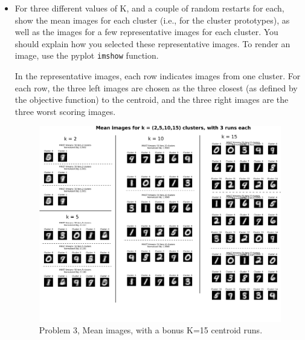 \documentclass[submit]{harvardml}
\newenvironment{answer}{%
\color{answergreen}\sffamily\large}{}
\begin{document}
\begin{itemize}
\begin{answer}
\end{answer}

\item For three different values of K, and a couple of random restarts for each, show the mean
    images for each cluster (i.e., for the cluster prototypes), as well as the images for a few
    representative images for each cluster. You should explain how you selected these representative
    images. To render an image, use the pyplot \texttt{imshow} function. 

\begin{answer}

In the representative images, each row indicates images from one cluster.
For each row, the three left images are chosen as the three closest (as defined
by the objective function) to the centroid, and the three right images are the three worst scoring images.

\begin{figure}[H]
        \centering
        \includegraphics[width=\textwidth,height=0.28\paperheight]{p3_means.png}
        \caption{Problem 3, Mean images, with a bonus K=15 centroid runs.}
        \label{P3 Means}


\end{figure}
\end{answer}
\end{itemize}
\end{document}
